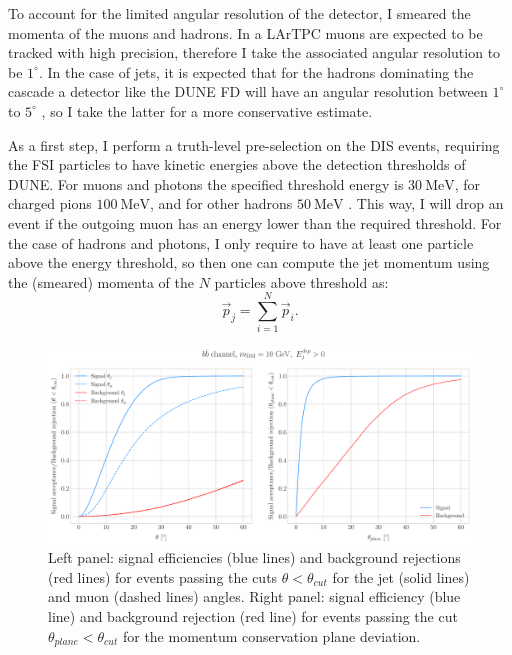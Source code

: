 To account for the limited angular resolution of the detector, I smeared the momenta of the muons and hadrons. In a LArTPC muons are expected to be tracked with high precision, therefore I take the associated angular resolution to be $1^{\circ}$. In the case of jets, it is expected that for the hadrons dominating the cascade a detector like the DUNE FD will have an angular resolution between $1^{\circ}$ to $5^{\circ}$ \cite{DUNE2020TDR2}, so I take the latter for a more conservative estimate.

As a first step, I perform a truth-level pre-selection on the DIS events, requiring the FSI particles to have kinetic energies above the detection thresholds of DUNE. For muons and photons the specified threshold energy is $30 ~ \mathrm{MeV}$, for charged pions $100 ~ \mathrm{MeV}$, and for other hadrons $50 ~ \mathrm{MeV}$ \cite{DUNE2020TDR2}. This way, I will drop an event if the outgoing muon has an energy lower than the required threshold. For the case of hadrons and photons, I only require to have at least one particle above the energy threshold, so then one can compute the jet momentum using the (smeared) momenta of the $N$ particles above threshold as:
\begin{equation}
	\vec{p}_{j} = \sum_{i=1}^{N} \vec{p}_{i}.
\end{equation}

\begin{figure}[t]
	\centering
	\includegraphics[width=0.95\linewidth]{Images/DM_Analysis/solardm_bb_100_dis_angular_cuts.pdf}
	\caption[Signal efficiency and background rejection for the $b\bar{b}$ sample with $m_{\mathrm{DM}} = 10 \ \mathrm{GeV}$ as a function of the angular cuts.]{Left panel: signal efficiencies (blue lines) and background rejections (red lines) for events passing the cuts $\theta < \theta_{cut}$ for the jet (solid lines) and muon (dashed lines) angles. Right panel: signal efficiency (blue line) and background rejection (red line) for events passing the cut $\theta_{plane} < \theta_{cut}$ for the momentum conservation plane deviation.}
	\label{fig:solardm_bb_100_dis_angular_cuts}
\end{figure}

